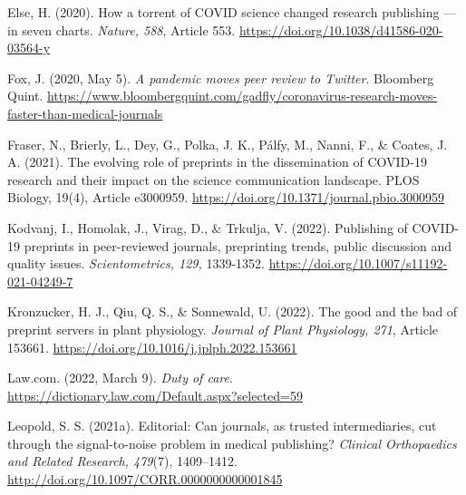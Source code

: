 \documentclass[authordate, empirical]{jote-new-article}
\begin{document}
	Else, H. (2020). How a torrent of COVID science changed research publishing — in seven charts. \emph{Nature, 588}, Article 553. \url{https://doi.org/10.1038/d41586-020-03564-y}







	Fox, J. (2020, May 5). \emph{A pandemic moves peer review to Twitter}. Bloomberg Quint. \url{https://www.bloombergquint.com/gadfly/coronavirus-research-moves-faster-than-medical-journals}







	Fraser, N., Brierly, L., Dey, G., Polka, J. K., Pálfy, M., Nanni, F., \& Coates, J. A. (2021). The evolving role of preprints in the dissemination of COVID-19 research and their impact on the science communication landscape. PLOS Biology, 19(4), Article e3000959. \url{https://doi.org/10.1371/journal.pbio.3000959}







	Kodvanj, I., Homolak, J., Virag, D., \& Trkulja, V. (2022). Publishing of COVID-19 preprints in peer-reviewed journals, preprinting trends, public discussion and quality issues. \emph{Scientometrics, 129, }1339-1352. \url{https://doi.org/10.1007/s11192-021-04249-7}







	Kronzucker, H. J., Qiu, Q. S., \& Sonnewald, U. (2022). The good and the bad of preprint servers in plant physiology. \emph{Journal of Plant Physiology, 271}, Article 153661. \url{https://doi.org/10.1016/j.jplph.2022.153661}







	Law.com. (2022, March 9). \emph{Duty of care}. \url{https://dictionary.law.com/Default.aspx?selected=59}







	Leopold, S. S. (2021a). Editorial: Can journals, as trusted intermediaries, cut through the signal-to-noise problem in medical publishing? \emph{Clinical Orthopaedics and Related Research, 479}(7), 1409--1412. \url{http://doi.org/10.1097/CORR.0000000000001845}
\end{document}
